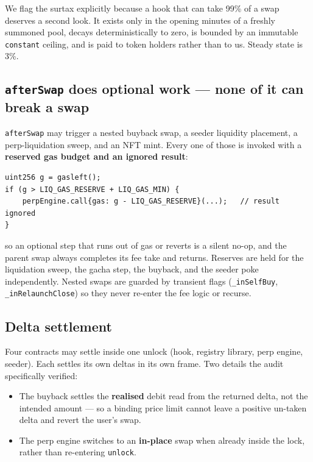 \documentclass[11pt,a4paper]{article}
\newcommand{\code}[1]{\texttt{\small #1}}
\begin{document}
\noindent We flag the surtax explicitly because a hook that can take 99\% of a
swap deserves a second look. It exists only in the opening minutes of a freshly
summoned pool, decays deterministically to zero, is bounded by an immutable
\code{constant} ceiling, and is paid to token holders rather than to us. Steady
state is 3\%.

\subsection{\code{afterSwap} does optional work --- none of it can break a swap}

\code{afterSwap} may trigger a nested buyback swap, a seeder liquidity
placement, a perp-liquidation sweep, and an NFT mint. Every one of those is
invoked with a \textbf{reserved gas budget and an ignored result}:

\begin{lstlisting}
uint256 g = gasleft();
if (g > LIQ_GAS_RESERVE + LIQ_GAS_MIN) {
    perpEngine.call{gas: g - LIQ_GAS_RESERVE}(...);   // result ignored
}
\end{lstlisting}

\noindent so an optional step that runs out of gas or reverts is a silent no-op,
and the parent swap always completes its fee take and returns. Reserves are held
for the liquidation sweep, the gacha step, the buyback, and the seeder poke
independently. Nested swaps are guarded by transient flags
(\code{\_inSelfBuy}, \code{\_inRelaunchClose}) so they never re-enter the fee
logic or recurse.

\subsection{Delta settlement}

Four contracts may settle inside one unlock (hook, registry library, perp engine,
seeder). Each settles its own deltas in its own frame. Two details the audit
specifically verified:

\begin{itemize}
\item The buyback settles the \textbf{realised} debit read from the returned
delta, not the intended amount --- so a binding price limit cannot leave a
positive un-taken delta and revert the user's swap.
\item The perp engine switches to an \textbf{in-place} swap when already inside
the lock, rather than re-entering \code{unlock}.
\end{itemize}
\end{document}
